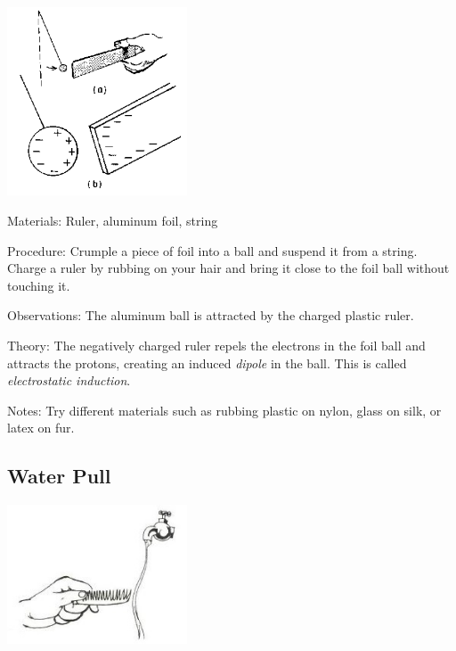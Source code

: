 \begin{multicols}{2}
\begin{center}
\includegraphics[width=0.4\textwidth]{./img/source/elec-induction.png}
\end{center}

\begin{description*}
\item[Materials:]{Ruler, aluminum foil, string}
\item[Procedure:]{Crumple a piece of foil into a ball and suspend it from a string. Charge a ruler by rubbing on your hair and bring it close to the foil ball without touching it.}
\item[Observations:]{The aluminum ball is attracted by the charged plastic ruler.}
\item[Theory:]{The negatively charged ruler repels the electrons in the foil ball and attracts the protons, creating an induced \emph{dipole} in the ball. This is called \emph{electrostatic induction}.}
\item[Notes:]{Try different materials such as rubbing plastic on nylon, glass on silk, or latex on fur.}
\end{description*}

\subsection{Water Pull}

\begin{center}
\includegraphics[width=0.4\textwidth]{./img/source/comb-water-2.jpg}
\end{center}


\end{multicols}
